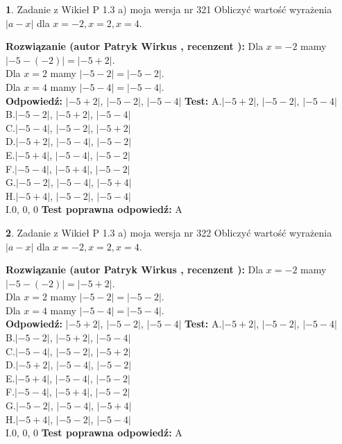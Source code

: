 \documentclass[12pt, a4paper]{article}
\theoremstyle{definition} %
\newtheorem{zad}{}
\newcommand{\zadStart}[1]{\begin{zad}#1\newline}
\newcommand{\zadStop}{\end{zad}}
\newcommand{\rozwStart}[2]{\noindent \textbf{Rozwiązanie (autor #1 , recenzent #2): }\newline}
\newcommand{\rozwStop}{\newline}
\newcommand{\odpStart}{\noindent \textbf{Odpowiedź:}\newline}
\newcommand{\odpStop}{\newline}
\newcommand{\testStart}{\noindent \textbf{Test:}\newline}
\newcommand{\testStop}{\newline}
\newcommand{\kluczStart}{\noindent \textbf{Test poprawna odpowiedź:}\newline}
\newcommand{\kluczStop}{\newline}
\begin{document}
\zadStart{Zadanie z Wikieł P 1.3 a) moja wersja nr 321}
Obliczyć wartość wyrażenia $|a - x|$ dla $x=-2,x=2,x=4$.
\zadStop
\rozwStart{Patryk Wirkus}{}
Dla $x = -2$ mamy $|-5 - (-2)| = |-5 + 2|$.\\
Dla $x = 2$ mamy $|-5 - 2| = |-5 - 2|$.\\
Dla $x = 4$ mamy $|-5 - 4| = |-5 - 4|$.\\
\rozwStop
\odpStart
$|-5 + 2|$, $|-5 - 2|$, $|-5 - 4|$
\odpStop
\testStart
A.$|-5 + 2|$, $|-5 - 2|$, $|-5 - 4|$\\
B.$|-5 - 2|$, $|-5 + 2|$, $|-5 - 4|$\\
C.$|-5 - 4|$, $|-5 - 2|$, $|-5 + 2|$\\
D.$|-5 + 2|$, $|-5 - 4|$, $|-5 - 2|$\\
E.$|-5 + 4|$, $|-5 - 4|$, $|-5 - 2|$\\
F.$|-5 - 4|$, $|-5 + 4|$, $|-5 - 2|$\\
G.$|-5 - 2|$, $|-5 - 4|$, $|-5 + 4|$\\
H.$|-5 + 4|$, $|-5 - 2|$, $|-5 - 4|$\\
I.$0$, $0$, $0$
\testStop
\kluczStart
A
\kluczStop



\zadStart{Zadanie z Wikieł P 1.3 a) moja wersja nr 322}
Obliczyć wartość wyrażenia $|a - x|$ dla $x=-2,x=2,x=4$.
\zadStop
\rozwStart{Patryk Wirkus}{}
Dla $x = -2$ mamy $|-5 - (-2)| = |-5 + 2|$.\\
Dla $x = 2$ mamy $|-5 - 2| = |-5 - 2|$.\\
Dla $x = 4$ mamy $|-5 - 4| = |-5 - 4|$.\\
\rozwStop
\odpStart
$|-5 + 2|$, $|-5 - 2|$, $|-5 - 4|$
\odpStop
\testStart
A.$|-5 + 2|$, $|-5 - 2|$, $|-5 - 4|$\\
B.$|-5 - 2|$, $|-5 + 2|$, $|-5 - 4|$\\
C.$|-5 - 4|$, $|-5 - 2|$, $|-5 + 2|$\\
D.$|-5 + 2|$, $|-5 - 4|$, $|-5 - 2|$\\
E.$|-5 + 4|$, $|-5 - 4|$, $|-5 - 2|$\\
F.$|-5 - 4|$, $|-5 + 4|$, $|-5 - 2|$\\
G.$|-5 - 2|$, $|-5 - 4|$, $|-5 + 4|$\\
H.$|-5 + 4|$, $|-5 - 2|$, $|-5 - 4|$\\
I.$0$, $0$, $0$
\testStop
\kluczStart
A
\kluczStop
\end{document}
